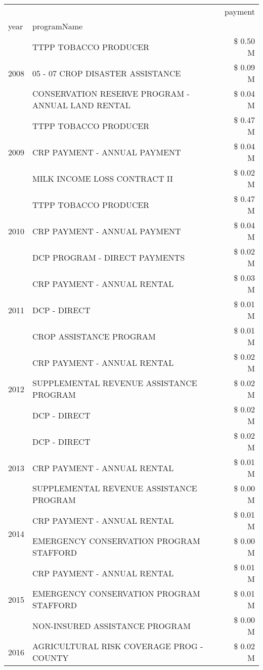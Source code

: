 \begin{tabular}{llr}
\toprule
 &  & payment \\
year & programName &  \\
\midrule
\multirow[t]{3}{*}{2008} & TTPP TOBACCO PRODUCER & \$ 0.50 M \\
 & 05 - 07 CROP DISASTER ASSISTANCE & \$ 0.09 M \\
 & CONSERVATION RESERVE PROGRAM - ANNUAL LAND RENTAL & \$ 0.04 M \\
\cline{1-3}
\multirow[t]{3}{*}{2009} & TTPP TOBACCO PRODUCER & \$ 0.47 M \\
 & CRP PAYMENT - ANNUAL PAYMENT & \$ 0.04 M \\
 & MILK INCOME LOSS CONTRACT II & \$ 0.02 M \\
\cline{1-3}
\multirow[t]{3}{*}{2010} & TTPP TOBACCO PRODUCER & \$ 0.47 M \\
 & CRP PAYMENT - ANNUAL PAYMENT & \$ 0.04 M \\
 & DCP PROGRAM - DIRECT PAYMENTS & \$ 0.02 M \\
\cline{1-3}
\multirow[t]{3}{*}{2011} & CRP PAYMENT - ANNUAL RENTAL & \$ 0.03 M \\
 & DCP - DIRECT & \$ 0.01 M \\
 & CROP ASSISTANCE PROGRAM & \$ 0.01 M \\
\cline{1-3}
\multirow[t]{3}{*}{2012} & CRP PAYMENT - ANNUAL RENTAL & \$ 0.02 M \\
 & SUPPLEMENTAL REVENUE ASSISTANCE PROGRAM & \$ 0.02 M \\
 & DCP - DIRECT & \$ 0.02 M \\
\cline{1-3}
\multirow[t]{3}{*}{2013} & DCP - DIRECT & \$ 0.02 M \\
 & CRP PAYMENT - ANNUAL RENTAL & \$ 0.01 M \\
 & SUPPLEMENTAL REVENUE ASSISTANCE PROGRAM & \$ 0.00 M \\
\cline{1-3}
\multirow[t]{2}{*}{2014} & CRP PAYMENT - ANNUAL RENTAL & \$ 0.01 M \\
 & EMERGENCY CONSERVATION PROGRAM STAFFORD & \$ 0.00 M \\
\cline{1-3}
\multirow[t]{3}{*}{2015} & CRP PAYMENT - ANNUAL RENTAL & \$ 0.01 M \\
 & EMERGENCY CONSERVATION PROGRAM STAFFORD & \$ 0.01 M \\
 & NON-INSURED ASSISTANCE PROGRAM & \$ 0.00 M \\
\cline{1-3}
\multirow[t]{3}{*}{2016} & AGRICULTURAL RISK COVERAGE PROG - COUNTY & \$ 0.02 M \\

\end{tabular}
